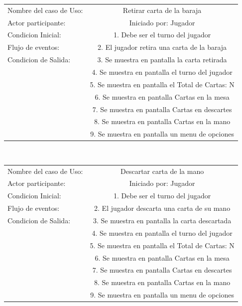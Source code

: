 \documentclass[60pt]{article}
\begin{document}
\begin{center}
    \begin{tabular}{ l | c  }
        Nombre del caso de Uso: & Retirar carta de la \gls{baraja} \\
        Actor participante: & Iniciado por: Jugador \\\hline
        Condicion Inicial: & 1. Debe ser el turno del jugador    \\
        Flujo de eventos: & 2. El jugador retira una carta de la \gls{baraja} \\\hline
        Condicion de Salida: & 3. Se muestra en pantalla la carta retirada \\
        & 4. Se muestra en pantalla el turno del jugador \\
        & 5. Se muestra en pantalla el Total de Cartas: N \\
        & 6. Se muestra en pantalla Cartas en la mesa \\
        & 7. Se muestra en pantalla Cartas en descartes \\
        & 8. Se muestra en pantalla Cartas en la mano \\
        & 9. Se muestra en pantalla un menu de opciones \\ 
    \end{tabular} \\
\end{center}
\begin{center}
    \begin{tabular}{ l | c  }
        Nombre del caso de Uso: & Descartar carta de la mano \\
        Actor participante: & Iniciado por: Jugador \\\hline
        Condicion Inicial: & 1. Debe ser el turno del jugador    \\
        Flujo de eventos: & 2. El jugador descarta una carta de su mano \\\hline
        Condicion de Salida: & 3. Se muestra en pantalla la carta descartada \\
        & 4. Se muestra en pantalla el turno del jugador \\
        & 5. Se muestra en pantalla el Total de Cartas: N \\
        & 6. Se muestra en pantalla Cartas en la mesa \\
        & 7. Se muestra en pantalla Cartas en descartes \\
        & 8. Se muestra en pantalla Cartas en la mano \\
        & 9. Se muestra en pantalla un menu de opciones \\ 
    \end{tabular} \\
\end{center}
\end{document}
